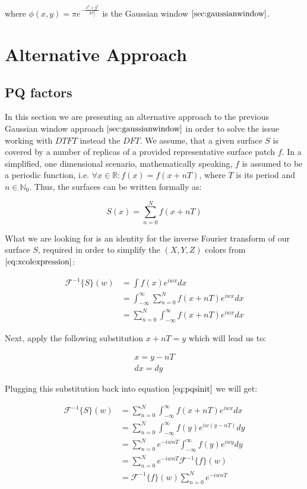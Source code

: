 where $\phi(x,y) = \pi e^{-\frac{x^2 + y^2}{2\sigma_{f}^2}}$ is the Gaussian window $\ref{sec:gaussianwindow}$.

\section{Alternative Approach}
\subsection{PQ factors}
\label{sec:pq}
In this section we are presenting an alternative approach to the previous Gaussian window approach 
$\ref{sec:gaussianwindow}$ 
in order to solve the issue working with $DTFT$ instead the $DFT$. We assume, that a given surface $S$ is covered by a number of replicas of a provided representative surface patch $f$. In a simplified, one dimensional scenario, mathematically speaking, $f$ is assumed to be a periodic function, i.e. $\forall x \in \mathds{R} : f(x) = f(x+nT)$, where $T$ is its period and $n \in \mathds{N}_{0}$. Thus, the surfaces can be written formally as:

\begin{equation}
  S(x) = \sum_{n=0}^N f(x+nT)
\label{eq:replicatedpatchsurface}
\end{equation}

What we are looking for is an identity for the inverse Fourier transform of our surface $S$, required in order to simplify the $(X,Y,Z)$ colors from $\ref{eq:xcolexpression}$:

\begin{align}
\mathcal{F}^{-1}\{S\}(w)
& =\int f(x) e^{iwx}dx \nonumber \\
& =\int_{-\infty}^{\infty} \sum_{n=0}^{N} f(x+nT) e^{iwx}dx \nonumber \\
& =\sum_{n=0}^{N} \int_{-\infty}^{\infty} f(x+nT) e^{iwx}dx
\label{eq:pqsinit}
\end{align}

Next, apply the following substitution $x+nT = y$ which will lead us to:

\begin{gather}
x=y-nT \nonumber \\
dx=dy
\label{eq:substitude1dpq}
\end{gather} 

Plugging this substitution back into equation $\ref{eq:pqsinit}$ we will get: 

\begin{align}
\mathcal{F}^{-1}\{S\}(w)
& =\sum_{n=0}^{N} \int_{-\infty}^{\infty} f(x+nT) e^{iwx}dx \nonumber \\
& =\sum_{n=0}^{N} \int_{-\infty}^{\infty} f(y) e^{iw(y-nT)}dy \nonumber \\
& =\sum_{n=0}^{N} e^{-iwnT} \int_{-\infty}^{\infty} f(y) e^{iwy}dy \nonumber \\
& =\sum_{n=0}^{N} e^{-iwnT} \mathcal{F}^{-1}\{f\}(w) \nonumber \\
& =\mathcal{F}^{-1}\{f\}(w) \sum_{n=0}^{N} e^{-iwnT}
\label{eq:pqsub}  
\end{align}

